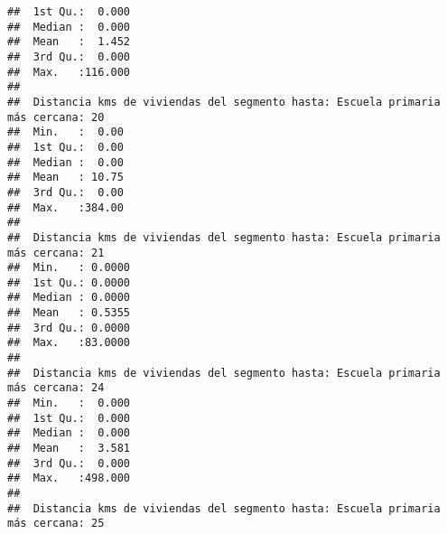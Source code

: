 \documentclass[11pt,]{article}
\begin{document}
\begin{verbatim}
##  1st Qu.:  0.000                                                                
##  Median :  0.000                                                                
##  Mean   :  1.452                                                                
##  3rd Qu.:  0.000                                                                
##  Max.   :116.000                                                                
##                                                                                 
##  Distancia kms de viviendas del segmento hasta: Escuela primaria más cercana: 20
##  Min.   :  0.00                                                                 
##  1st Qu.:  0.00                                                                 
##  Median :  0.00                                                                 
##  Mean   : 10.75                                                                 
##  3rd Qu.:  0.00                                                                 
##  Max.   :384.00                                                                 
##                                                                                 
##  Distancia kms de viviendas del segmento hasta: Escuela primaria más cercana: 21
##  Min.   : 0.0000                                                                
##  1st Qu.: 0.0000                                                                
##  Median : 0.0000                                                                
##  Mean   : 0.5355                                                                
##  3rd Qu.: 0.0000                                                                
##  Max.   :83.0000                                                                
##                                                                                 
##  Distancia kms de viviendas del segmento hasta: Escuela primaria más cercana: 24
##  Min.   :  0.000                                                                
##  1st Qu.:  0.000                                                                
##  Median :  0.000                                                                
##  Mean   :  3.581                                                                
##  3rd Qu.:  0.000                                                                
##  Max.   :498.000                                                                
##                                                                                 
##  Distancia kms de viviendas del segmento hasta: Escuela primaria más cercana: 25

\end{verbatim}
\end{document}
